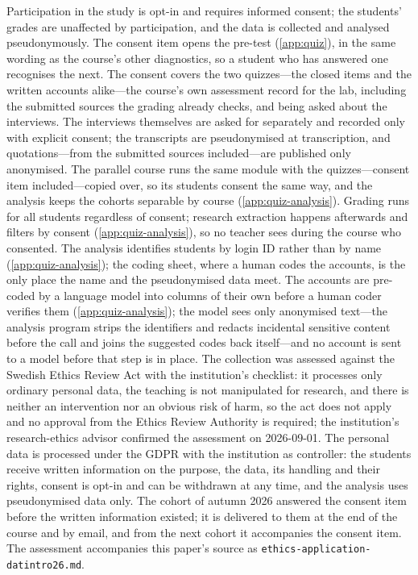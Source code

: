 Participation in the study is opt-in and requires informed consent; the
students' grades are unaffected by participation, and the data is
collected and analysed pseudonymously.
The consent item opens the pre-test (\cref{app:quiz}), in the same
wording as the course's other diagnostics, so a student who has answered
one recognises the next.
The consent covers the two quizzes---the closed items and the written
accounts alike---the course's own assessment record for the lab,
including the submitted sources the grading already checks, and being
asked about the interviews.
The interviews themselves are asked for separately and recorded only
with explicit consent; the transcripts are pseudonymised at
transcription, and quotations---from the submitted sources
included---are published only anonymised.
The parallel course runs the same module with the quizzes---consent item
included---copied over, so its students consent the same way, and the
analysis keeps the cohorts separable by course (\cref{app:quiz-analysis}).
Grading runs for all students regardless of consent; research extraction
happens afterwards and filters by consent (\cref{app:quiz-analysis}), so
no teacher sees during the course who consented.
The analysis identifies students by login ID rather than by name
(\cref{app:quiz-analysis}); the coding sheet, where a human codes the
accounts, is the only place the name and the pseudonymised data meet.
The accounts are pre-coded by a language model into columns of their
own before a human coder verifies them (\cref{app:quiz-analysis}); the
model sees only anonymised text---the analysis program strips the
identifiers and redacts incidental sensitive content before the call and
joins the suggested codes back itself---and no account is sent to a
model before that step is in place.
The collection was assessed against the Swedish Ethics Review Act
\autocite{Etikprovningslagen} with the institution's checklist: it
processes only ordinary personal data, the teaching is not manipulated
for research, and there is neither an intervention nor an obvious risk
of harm, so the act does not apply and no approval from the Ethics
Review Authority is required; the institution's research-ethics advisor
confirmed the assessment on 2026-09-01.
The personal data is processed under the GDPR with the institution as
controller: the students receive written information on the purpose,
the data, its handling and their rights, consent is opt-in and can be
withdrawn at any time, and the analysis uses pseudonymised data only.
The cohort of autumn 2026 answered the consent item before the written
information existed; it is delivered to them at the end of the course
and by email, and from the next cohort it accompanies the consent item.
The assessment accompanies this paper's source as
\texttt{ethics-application-datintro26.md}.

